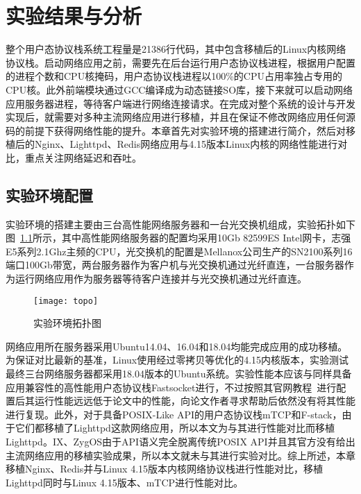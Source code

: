 \chapter{实验结果与分析}

整个用户态协议栈系统工程量是21386行代码，其中包含移植后的Linux内核网络协议栈。启动网络应用之前，需要先在后台运行用户态协议栈进程，根据用户配置的进程个数和CPU核掩码，用户态协议栈进程以100\%的CPU占用率独占专用的CPU核。此外前端模块通过GCC编译成为动态链接SO库，接下来就可以启动网络应用服务器进程，等待客户端进行网络连接请求。在完成对整个系统的设计与开发实现后，就需要对多种主流网络应用进行移植，并且在保证不修改网络应用任何源码的前提下获得网络性能的提升。本章首先对实验环境的搭建进行简介，然后对移植后的Nginx、Lighttpd、Redis网络应用与4.15版本Linux内核的网络性能进行对比，重点关注网络延迟和吞吐。

\section{实验环境配置}
实验环境的搭建主要由三台高性能网络服务器和一台光交换机组成，实验拓扑如下图~\ref{fig:topo}所示，其中高性能网络服务器的配置均采用10Gb 82599ES Intel网卡，志强E5系列2.1Ghz主频的CPU，光交换机的配置是Mellanox公司生产的SN2100系列16端口100Gb带宽，两台服务器作为客户机与光交换机通过光纤直连，一台服务器作为运行网络应用作为服务器等待客户连接并与光交换机通过光纤直连。

\vspace{-10pt}
\begin{figure}[H] %
  \centering
  \texttt{[image: topo]}
  \caption{实验环境拓扑图}
  \label{fig:topo}
\end{figure}
\vspace{-10pt}

网络应用所在服务器采用Ubuntu14.04、16.04和18.04均能完成应用的成功移植。为保证对比最新的基准，Linux使用经过零拷贝等优化的4.15内核版本，实验测试最终三台网络服务器都采用18.04版本的Ubuntu系统。实验性能本应该与同样具备应用兼容性的高性能用户态协议栈Fastsocket进行，不过按照其官网教程~\cite{fastsocket-release}进行配置后其运行性能远远低于论文中的性能，向论文作者寻求帮助后依然没有将其性能进行复现。此外，对于具备POSIX-Like API的用户态协议栈mTCP和F-stack，由于它们都移植了Lighttpd这款网络应用，所以本文为与其进行性能对比而移植Lighttpd。IX、ZygOS由于API语义完全脱离传统POSIX API并且其官方没有给出主流网络应用的移植实验成果，所以本文就未与其进行实验对比。综上所述，本章移植Nginx、Redis并与Linux 4.15版本内核网络协议栈进行性能对比，移植Lighttpd同时与Linux 4.15版本、mTCP进行性能对比。
